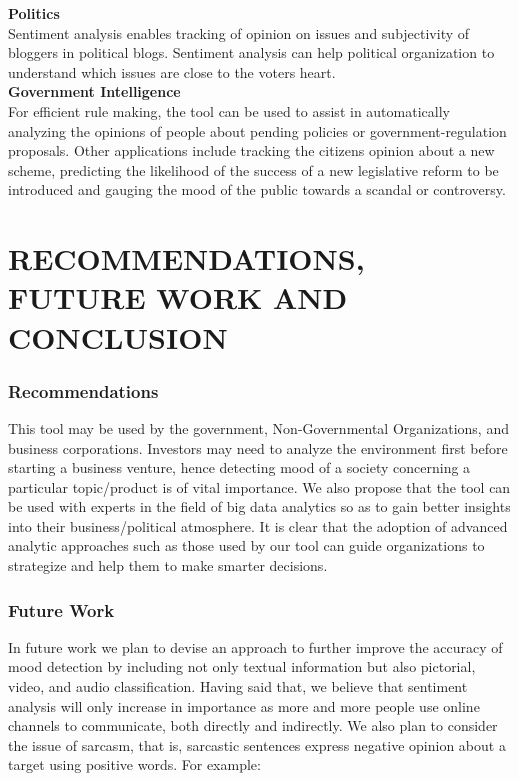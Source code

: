 \textbf{Politics}\\
Sentiment analysis enables tracking of opinion on issues and subjectivity of bloggers in
political blogs. Sentiment analysis can help political organization to understand which issues
are close to the voter\textquotesingle s heart.\\

\textbf{Government Intelligence}\\
For efficient rule making, the tool can be used to assist in automatically analyzing the opinions of
people about pending policies or government-regulation proposals. Other applications include
tracking the citizen\textquotesingle s opinion about a new scheme, predicting the likelihood of the success of a new legislative reform to be introduced and gauging the mood of the public towards a scandal
or controversy.



\chapter{RECOMMENDATIONS, FUTURE WORK AND CONCLUSION}
\subsection{Recommendations}
This tool may be used by the government, Non-Governmental Organizations, and business
corporations. Investors may need to analyze the environment first before starting a business
venture, hence detecting mood of a society concerning a particular topic/product is of vital importance.
We also propose that the tool can be used with experts in the field of big data analytics so as to gain
better insights into their business/political atmosphere. It is clear that the adoption of advanced analytic approaches such as those used by our tool can guide organization\textquotesingle s to  strategize and help them to make smarter decisions.\\

\subsection{Future Work}
In future work we plan to devise an approach to further improve the accuracy of mood detection by including not only textual information but also pictorial, video, and audio classification.
Having said that, we believe that sentiment analysis will only increase in importance as more and
more people use online channels to communicate, both directly and indirectly.
We also plan to consider the issue of sarcasm, that is, sarcastic sentences express negative opinion
about a target using positive words. For example:\\

